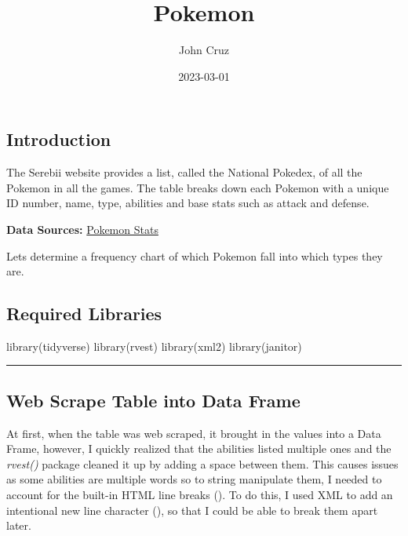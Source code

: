 \documentclass[
]{article}
\title{Pokemon}
\author{John Cruz}
\date{2023-03-01}
\newenvironment{Shaded}{\begin{snugshade}}{\end{snugshade}}
\newcommand{\FunctionTok}[1]{\textcolor[rgb]{0.00,0.00,0.00}{#1}}
\newcommand{\NormalTok}[1]{#1}
\begin{document}
\maketitle

\hypertarget{introduction}{%
\subsection{Introduction}\label{introduction}}

The Serebii website provides a list, called the National Pokedex, of all
the Pokemon in all the games. The table breaks down each Pokemon with a
unique ID number, name, type, abilities and base stats such as attack
and defense.

\textbf{Data Sources:}
\href{https://www.serebii.net/pokemon/nationalpokedex.shtml}{Pokemon
Stats}

Lets determine a frequency chart of which Pokemon fall into which types
they are.

\hypertarget{required-libraries}{%
\subsection{Required Libraries}\label{required-libraries}}

\begin{Shaded}
\begin{Highlighting}[]
\FunctionTok{library}\NormalTok{(tidyverse)}
\FunctionTok{library}\NormalTok{(rvest)}
\FunctionTok{library}\NormalTok{(xml2)}
\FunctionTok{library}\NormalTok{(janitor)}
\end{Highlighting}
\end{Shaded}

\begin{center}\rule{0.5\linewidth}{0.5pt}\end{center}

\hypertarget{web-scrape-table-into-data-frame}{%
\subsection{Web Scrape Table into Data
Frame}\label{web-scrape-table-into-data-frame}}

At first, when the table was web scraped, it brought in the values into
a Data Frame, however, I quickly realized that the abilities listed
multiple ones and the \emph{rvest()} package cleaned it up by adding a
space between them. This causes issues as some abilities are multiple
words so to string manipulate them, I needed to account for the built-in
HTML line breaks (). To do this, I used XML to add an intentional new
line character (\n), so that I could be able to break them apart later.
\end{document}

